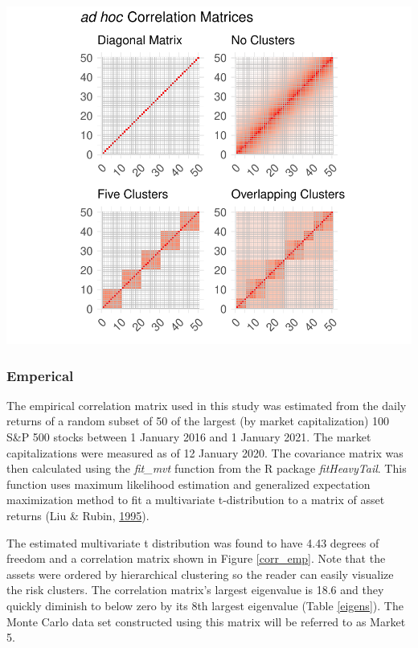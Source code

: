 \documentclass[11pt,preprint, authoryear]{elsarticle}
\let\origfigure\figure
\let\endorigfigure\endfigure
\renewenvironment{figure}[1][2] {
    \expandafter\origfigure\expandafter[H]
} {
    \endorigfigure
}
\numberwithin{equation}{section}
\numberwithin{figure}{section}
\numberwithin{table}{section}
\begin{document}
\begin{figure}
\centering
\includegraphics{Thesis_files/figure-latex/corr mats-1.pdf}
\caption{\label{corr_mats} Correlation Matricies}
\end{figure}

\hypertarget{emperical}{%
\subsubsection{\texorpdfstring{Emperical
\label{emp}}{Emperical }}\label{emperical}}

The empirical correlation matrix used in this study was estimated from
the daily returns of a random subset of 50 of the largest (by market
capitalization) 100 S\&P 500 stocks between 1 January 2016 and 1 January
2021. The market capitalizations were measured as of 12 January 2020.
The covariance matrix was then calculated using the \emph{fit\_mvt}
function from the R package \emph{fitHeavyTail}. This function uses
maximum likelihood estimation and generalized expectation maximization
method to fit a multivariate t-distribution to a matrix of asset returns
(Liu \& Rubin, \protect\hyperlink{ref-liu1995}{1995}).

The estimated multivariate t distribution was found to have 4.43 degrees
of freedom and a correlation matrix shown in Figure \ref{corr_emp}. Note
that the assets were ordered by hierarchical clustering so the reader
can easily visualize the risk clusters. The correlation matrix's largest
eigenvalue is 18.6 and they quickly diminish to below zero by its 8th
largest eigenvalue (Table \ref{eigens}). The Monte Carlo data set
constructed using this matrix will be referred to as Market 5.
\end{document}
